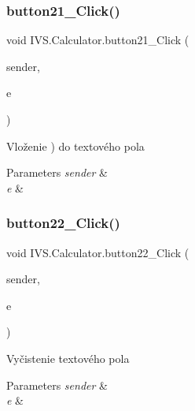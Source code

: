 \subsubsection{\texorpdfstring{button21\+\_\+\+Click()}{button21\_Click()}}
{\footnotesize\ttfamily void I\+V\+S.\+Calculator.\+button21\+\_\+\+Click (\begin{DoxyParamCaption}\item[{object}]{sender,  }\item[{Event\+Args}]{e }\end{DoxyParamCaption})\hspace{0.3cm}{\ttfamily [protected]}}



Vloženie \textquotesingle{})\textquotesingle{} do textového pola 


\begin{DoxyParams}{Parameters}
{\em sender} & \\
\hline
{\em e} & \\
\hline
\end{DoxyParams}
\mbox{\label{class_i_v_s_1_1_calculator_aabdaceb3733e6b9873224d39ba10aec0}} 
\subsubsection{\texorpdfstring{button22\+\_\+\+Click()}{button22\_Click()}}
{\footnotesize\ttfamily void I\+V\+S.\+Calculator.\+button22\+\_\+\+Click (\begin{DoxyParamCaption}\item[{object}]{sender,  }\item[{Event\+Args}]{e }\end{DoxyParamCaption})\hspace{0.3cm}{\ttfamily [protected]}}



Vyčistenie textového pola 


\begin{DoxyParams}{Parameters}
{\em sender} & \\
\hline
{\em e} & \\
\hline
\end{DoxyParams}
\mbox{\label{class_i_v_s_1_1_calculator_a429d9cfc3bda07afb25f3acdec8894b2}} 
